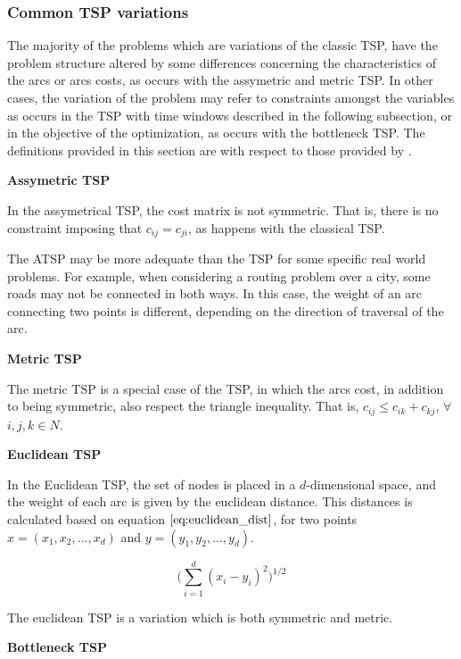 \subsubsection{Common TSP variations}
\label{sec:tsp_variations}

The majority of the problems which are variations of the classic TSP,
have the problem structure altered by some differences concerning the characteristics of the arcs or arcs costs,
as occurs with the assymetric and metric TSP.
In other cases, the variation of the problem may refer to constraints amongst the variables
as occurs in the TSP with time windows described in the following subsection,
or in the objective of the optimization, as occurs with the bottleneck TSP.
The definitions provided in this section are with respect to those provided by \cite{tsp_book}.

\textbf{Assymetric TSP}

In the assymetrical TSP, the cost matrix is not symmetric. That is, there is no constraint
imposing that $c_{ij} = c_{ji}$, as happens with the classical TSP.

The ATSP may be more adequate than the TSP for some specific real world problems.
For example, when considering a routing problem over a city,
some roads may not be connected in both ways. In this case, the weight of an arc
connecting two points is different, depending on the direction of traversal of the arc.


\textbf{Metric TSP}

The metric TSP is a special case of the TSP, in which the arcs cost,
in addition to being symmetric, also respect the triangle inequality. That is,
$c_{ij} \leq c_{ik} + c_{kj}$, $\forall$ $i, j, k \in N$.


\textbf{Euclidean TSP}

In the Euclidean TSP, the set of nodes is placed in a $d$-dimensional space,
and the weight of each arc is given by the euclidean distance. This distances is
calculated based on equation $\ref{eq:euclidean_dist}$, for two points
$x = (x_{1}, x_{2}, ..., x_{d})$ and $y = (y_{1}, y_{2}, ..., y_{d})$.

\begin{equation}
\label{eq:euclidean_dist}
  \bigg( \sum_{i=1}^{d} (x_{i}-y_{i})^2\bigg)^{1/2}
\end{equation}

The euclidean TSP is a variation which is both symmetric and metric.

\textbf{Bottleneck TSP}

